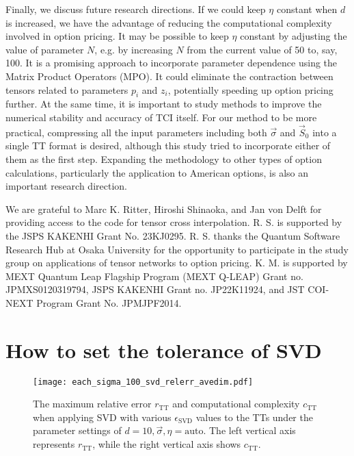 Finally, we discuss future research directions. 
If we could keep $\eta$ constant when $d$ is increased, we have the advantage of reducing the computational complexity involved in option pricing.
It may be possible to keep $\eta$ constant by adjusting the value of parameter $N$, e.g. by increasing $N$ from the current value of 50 to, say, 100.
It is a promising approach to incorporate parameter dependence using the Matrix Product Operators (MPO). 
It could eliminate the contraction between tensors related to parameters $p_i$ and $z_i$, potentially speeding up option pricing further. 
At the same time, it is important to study methods to improve the numerical stability and accuracy of TCI itself. 
For our method to be more practical, compressing all the input parameters including both $\vec{\sigma}$ and $\vec{S}_0$ into a single TT format is desired, although this study tried to incorporate either of them as the first step.
Expanding the methodology to other types of option calculations, particularly the application to American options, is also an important research direction.

\begin{acknowledgments}
We are grateful to Marc K. Ritter, Hiroshi Shinaoka, and Jan von Delft for providing access to the code for tensor cross interpolation. 
R. S. is supported by the JSPS KAKENHI Grant No. 23KJ0295. R. S. thanks the Quantum Software Research Hub at Osaka University for the opportunity to participate in the study group on applications of tensor networks to option pricing.
K. M. is supported by MEXT Quantum Leap Flagship Program (MEXT Q-LEAP) Grant no. JPMXS0120319794, JSPS KAKENHI Grant no. JP22K11924, and JST COI-NEXT Program Grant No. JPMJPF2014.
\end{acknowledgments}






\appendix

\section{How to set the tolerance of SVD}\label{appendix:svd_tol}
\begin{figure}[ht]
    \centering
        \texttt{[image: each\_sigma\_100\_svd\_relerr\_avedim.pdf]}
        \caption{
        The maximum relative error $r_{\mathrm{TT}}$ and computational complexity $c_{\mathrm{TT}}$ when applying SVD with various $\epsilon_{\mathrm{SVD}}$ values to the TTs under the parameter settings of $d = 10, \vec{\sigma}, \eta = \text{auto}$. 
        The left vertical axis represents $r_{\mathrm{TT}}$, while the right vertical axis shows $c_{\mathrm{TT}}$.
        }
\label{fig:each_sigma_100_svd_relerr_avedim}
\end{figure}

